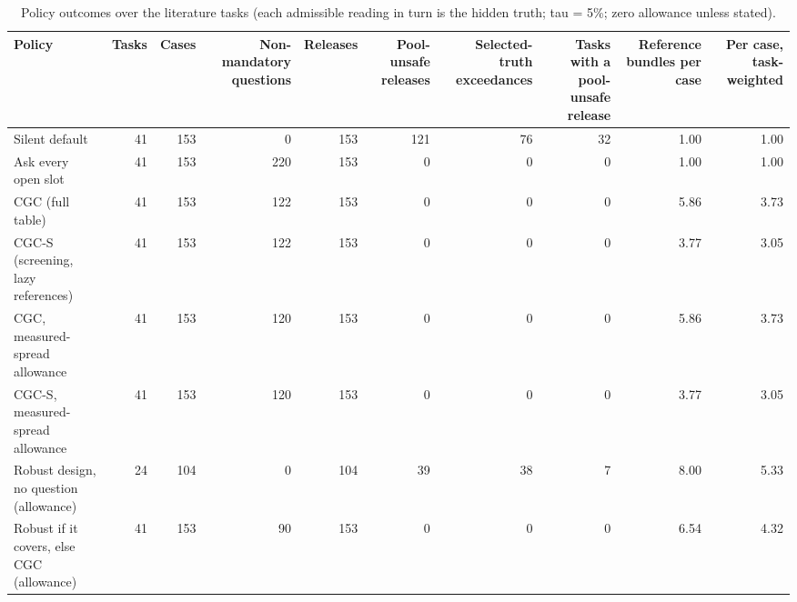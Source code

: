 \begin{table}[t]
\centering\small
\caption{Policy outcomes over the literature tasks (each admissible reading in turn is the hidden truth; tau = 5\%; zero allowance unless stated).}
\label{tab:tab_policies}
\begin{tabular}{lrrrrrrrrr}
\toprule
Policy & Tasks & Cases & Non-mandatory questions & Releases & Pool-unsafe releases & Selected-truth exceedances & Tasks with a pool-unsafe release & Reference bundles per case & Per case, task-weighted \\
\midrule
Silent default & 41 & 153 & 0 & 153 & 121 & 76 & 32 & 1.00 & 1.00 \\
Ask every open slot & 41 & 153 & 220 & 153 & 0 & 0 & 0 & 1.00 & 1.00 \\
CGC (full table) & 41 & 153 & 122 & 153 & 0 & 0 & 0 & 5.86 & 3.73 \\
CGC-S (screening, lazy references) & 41 & 153 & 122 & 153 & 0 & 0 & 0 & 3.77 & 3.05 \\
CGC, measured-spread allowance & 41 & 153 & 120 & 153 & 0 & 0 & 0 & 5.86 & 3.73 \\
CGC-S, measured-spread allowance & 41 & 153 & 120 & 153 & 0 & 0 & 0 & 3.77 & 3.05 \\
Robust design, no question (allowance) & 24 & 104 & 0 & 104 & 39 & 38 & 7 & 8.00 & 5.33 \\
Robust if it covers, else CGC (allowance) & 41 & 153 & 90 & 153 & 0 & 0 & 0 & 6.54 & 4.32 \\
\bottomrule
\end{tabular}
\end{table}
